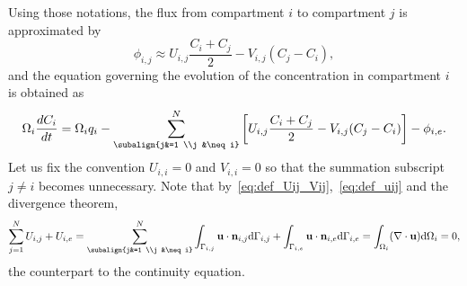 Using those notations, the flux from compartment $i$ to compartment $j$ is approximated by
\begin{equation}
	\phi_{i,j} \approx U_{i,j} \frac{C_i + C_j}{2} - V_{i,j}(C_j - C_i),
\end{equation}
and the equation governing the evolution of the concentration in compartment $i$ is obtained as
\begin{equation} \label{eq:compartmentmodel}
	\Omega_i \frac{dC_i}{dt} = \Omega_i q_i - \sum_{\subalign{j&=1 \\j &\neq i}}^N \left[ U_{i,j}\frac{C_i + C_j}{2} - V_{i,j} (C_j-C_i)\right] - \phi_{i,e}.
\end{equation}
Let us fix the convention $U_{i,i} = 0$ and $V_{i,i} = 0$ so that the summation subscript $j \neq i$ becomes unnecessary.
Note that by~\eqref{eq:def_Uij_Vij},~\eqref{eq:def_uij} and the divergence theorem,
\begin{equation} \label{eq:continuitycompartment}
	\sum_{j=1}^N U_{i,j} + U_{i,e} = \sum_{\subalign{j&=1 \\j &\neq i}}^N \int_{\Gamma_{i,j}}\b u \cdot \b n_{i,j} \rm d\Gamma_{i,j} + \int_{\Gamma_{i,e}}\b u \cdot \b n_{i,e} \rm d\Gamma_{i,e} = \int_{\Omega_{i}} (\nabla \cdot \b u) \rm d\Omega_{i} = 0,
\end{equation}
the counterpart to the continuity equation.